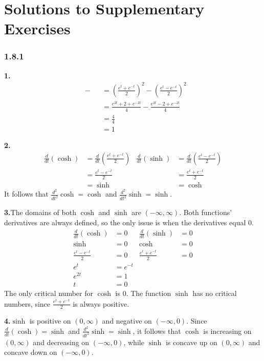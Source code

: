 \documentclass[12pt,]{book}
\theoremstyle{plain}
\theoremstyle{definition}
\numberwithin{equation}{section}
\newcommand{\fe}[2]{\mathop{{#1}{\left(#2\right)}}}
\newcommand{\ointerval}[2]{\left(#1,#2\right)}
\newcommand{\lzoo}[2]{{\frac{d}{d#1}}{\left(#2\right)}}
\newcommand{\lzon}[2]{\frac{d^{#1}}{d#2^{#1}}}
\begin{document}
\chapter[Solutions to Supplementary Exercises]{Solutions to Supplementary Exercises}\label{appendix-1}
\begin{multicols}{2}
{\tiny
\subsection*{1.8.1 }
\noindent\textbf{1.}\quad{}\begin{align*}
\fe{\cosh^2}{t}-\fe{\sinh^2}{t}&=\left(\frac{e^{t}+e^{-t}}{2}\right)^2-\left(\frac{e^{t}-e^{-t}}{2}\right)^2\\
&=\frac{e^{2t}+2+e^{-2t}}{4}-\frac{e^{2t}-2+e^{-2t}}{4}\\
&=\frac{4}{4}\\
&=1
\end{align*}%
\par\smallskip
\noindent\textbf{2.}\quad{}\begin{align*}
\lzoo{t}{\fe{\cosh}{t}}&=\lzoo{t}{\frac{e^{t}+e^{-t}}{2}}&\lzoo{t}{\fe{\sinh}{t}}&=\lzoo{t}{\frac{e^{t}-e^{-t}}{2}}\\
&=\frac{e^{t}-e^{-t}}{2}&&=\frac{e^{t}+e^{-t}}{2}\\
&=\fe{\sinh}{t}&&=\fe{\cosh}{t}
\end{align*}It follows that \(\lzon{2}{t}{\fe{\cosh}{t}}=\fe{\cosh}{t}\) and \(\lzon{2}{t}{\fe{\sinh}{t}}=\fe{\sinh}{t}\).%
\par\smallskip
\noindent\textbf{3.}\quad{}The domains of both \(\cosh\) and \(\sinh\) are \(\ointerval{-\infty}{\infty}\). Both functions' derivatives are always defined, so the only issue is when the derivatives equal \(0\).\begin{align*}
\lzoo{t}{\fe{\cosh}{t}}&=0&\lzoo{t}{\fe{\sinh}{t}}&=0\\
\fe{\sinh}{t}&=0&\fe{\cosh}{t}&=0\\
\frac{e^{t}-e^{-t}}{2}&=0&\frac{e^{t}+e^{-t}}{2}&=0\\
e^{t}&=e^{-t}&&\\
e^{2t}&=1&&\\
t&=0&&
\end{align*}The only critical number for \(\cosh\) is \(0\). The function \(\sinh\) has no critical numbers, since \(\frac{e^{t}+e^{-t}}{2}\) is always positive.%
\par\smallskip
\noindent\textbf{4.}\quad{}\(\fe{\sinh}{t}\) is positive on \(\ointerval{0}{\infty}\) and negative on \(\ointerval{-\infty}{0}\). Since \(\lzoo{t}{\fe{\cosh}{t}}=\fe{\sinh}{t}\) and \(\lzon{2}{t}{\fe{\sinh}{t}}=\fe{\sinh}{t}\), it follows that \(\cosh\) is increasing on \(\ointerval{0}{\infty}\) and decreasing on \(\ointerval{-\infty}{0}\), while \(\sinh\) is concave up on \(\ointerval{0}{\infty}\) and concave down on \(\ointerval{-\infty}{0}\).%
}
\end{multicols}
\end{document}
